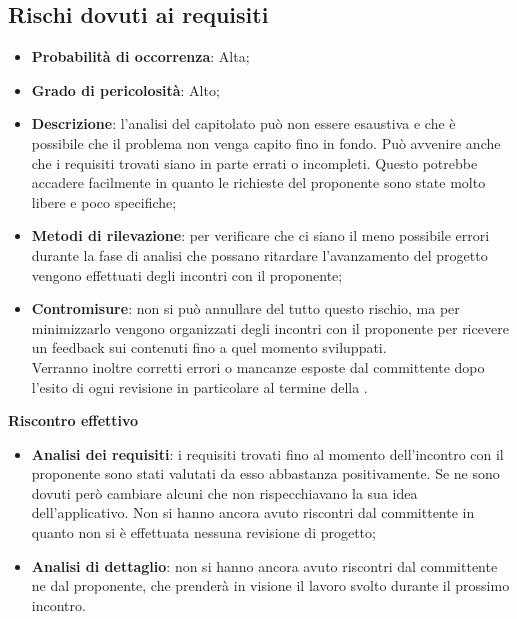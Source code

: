 

	\subsection{Rischi dovuti ai requisiti} %
	\label{sub:rischi_dovuti_ai_requisiti}
		\begin{itemize}
			\item \textbf{Probabilità di occorrenza}: Alta;
			\item \textbf{Grado di pericolosità}: Alto;
			\item \textbf{Descrizione}: l'analisi del capitolato può non essere esaustiva e che è possibile che il problema non venga capito fino in fondo. Può avvenire anche che i requisiti trovati siano in parte errati o incompleti. Questo potrebbe accadere facilmente in quanto le richieste del proponente sono state molto libere e poco specifiche;
			\item \textbf{Metodi di rilevazione}: per verificare che ci siano il meno possibile errori durante la fase di analisi che possano ritardare l'avanzamento del progetto vengono effettuati degli incontri con il proponente;
			\item \textbf{Contromisure}: non si può annullare del tutto questo rischio, ma per minimizzarlo vengono organizzati degli incontri con il proponente per ricevere un feedback sui contenuti fino a quel momento sviluppati. \\
			Verranno inoltre corretti errori o mancanze esposte dal committente dopo l'esito di ogni revisione in particolare al termine della \RR.			
		\end{itemize}
	\noindent
	\textbf{Riscontro effettivo}
		\begin{itemize}
			\item \textbf{Analisi dei requisiti}: i requisiti trovati fino al momento dell'incontro con il proponente sono stati valutati da esso abbastanza positivamente. Se ne sono dovuti però cambiare alcuni che non rispecchiavano la sua idea dell'applicativo.  \newline
			Non si hanno ancora avuto riscontri dal committente in quanto non si è effettuata nessuna revisione di progetto;
			\item \textbf{Analisi di dettaglio}: non si hanno ancora avuto riscontri dal committente ne dal proponente, che prenderà in visione il lavoro svolto durante il prossimo incontro.
		\end{itemize}

